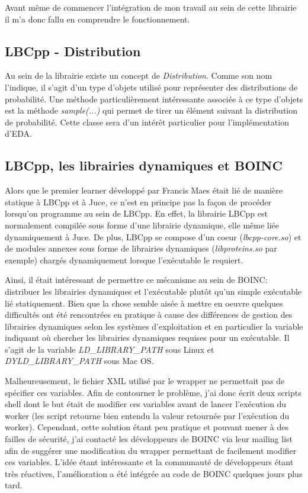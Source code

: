 \documentclass[a4paper, 11pt]{report}
\begin{document}
Avant même de commencer l'intégration de mon travail au sein de cette librairie il m'a donc fallu en comprendre le fonctionnement.

\subsection{LBCpp - Distribution}
Au sein de la librairie existe un concept de \textit{Distribution}. Comme son nom l'indique, il s'agit d'un type d'objets utilisé pour représenter des distributions de probabilité. Une méthode particulièrement intéressante associée à ce type d'objets est la méthode \textit{sample(...)} qui permet de tirer un élément suivant la distribution de probabilité. Cette classe sera d'un intérêt particulier pour l'implémentation d'EDA.

\subsection{LBCpp, les librairies dynamiques et BOINC}
Alors que le premier learner développé par Francis Maes était lié de manière statique à LBCpp et à Juce, ce n'est en principe pas la façon de procéder lorsqu'on programme au sein de LBCpp. En effet, la librairie LBCpp est normalement compilée sous forme d'une librairie dynamique, elle même liée dynamiquement à Juce. De plus, LBCpp se compose d'un coeur (\textit{lbcpp-core.so}) et de modules annexes sous forme de librairies dynamiques (\textit{libproteins.so} par exemple) chargés dynamiquement lorsque l'exécutable le requiert.

Ainsi, il était intéressant de permettre ce mécanisme au sein de \textsc{BOINC}: distribuer les librairies dynamiques et l'exécutable plutôt qu'un simple exécutable lié statiquement. Bien que la chose semble aisée à mettre en oeuvre quelques difficultés ont été rencontrées en pratique à cause des différences de gestion des librairies dynamiques selon les systèmes d'exploitation et en particulier la variable indiquant où chercher les librairies dynamiques requises pour un exécutable. Il s'agit de la variable \textit{LD\_LIBRARY\_PATH} sous Linux et \textit{DYLD\_LIBRARY\_PATH} sous Mac OS. 

Malheureusement, le fichier XML utilisé par le wrapper ne permettait pas de spécifier ces variables. Afin de contourner le problème, j'ai donc écrit deux scripts shell dont le but était de modifier ces variables avant de lancer l'exécution du worker (les script retourne bien entendu la valeur retournée par l'exécution du worker). Cependant, cette solution étant peu pratique et pouvant mener à des failles de sécurité, j'ai contacté les développeurs de \textsc{BOINC} via leur mailing list afin de suggérer une modification du wrapper permettant de facilement modifier ces variables. L'idée étant intéressante et la communauté de développeurs étant très réactives, l'amélioration a été intégrée au code de \textsc{BOINC} quelques jours plus tard. %
\end{document}
